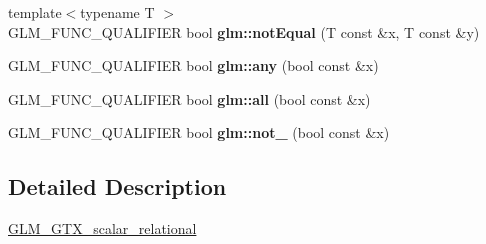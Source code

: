 \begin{DoxyCompactItemize}
\item 
\mbox{\label{scalar__relational_8inl_ab4ee9100dc2b4e41ef91ff6898f979e2}} 
{\footnotesize template$<$typename T $>$ }\\G\+L\+M\+\_\+\+F\+U\+N\+C\+\_\+\+Q\+U\+A\+L\+I\+F\+I\+ER bool {\bfseries glm\+::not\+Equal} (T const \&x, T const \&y)
\item 
\mbox{\label{scalar__relational_8inl_ad41a7e46efe59ecfa701a0d561b7e8fa}} 
G\+L\+M\+\_\+\+F\+U\+N\+C\+\_\+\+Q\+U\+A\+L\+I\+F\+I\+ER bool {\bfseries glm\+::any} (bool const \&x)
\item 
\mbox{\label{scalar__relational_8inl_a55c4531f4a0de48f87a20702d96d4289}} 
G\+L\+M\+\_\+\+F\+U\+N\+C\+\_\+\+Q\+U\+A\+L\+I\+F\+I\+ER bool {\bfseries glm\+::all} (bool const \&x)
\item 
\mbox{\label{scalar__relational_8inl_a081b70b3c919d22f18bb04e6f9c3b7ca}} 
G\+L\+M\+\_\+\+F\+U\+N\+C\+\_\+\+Q\+U\+A\+L\+I\+F\+I\+ER bool {\bfseries glm\+::not\+\_\+} (bool const \&x)
\end{DoxyCompactItemize}


\subsection{Detailed Description}
\hyperlink{group__gtx__scalar__relational}{G\+L\+M\+\_\+\+G\+T\+X\+\_\+scalar\+\_\+relational} 